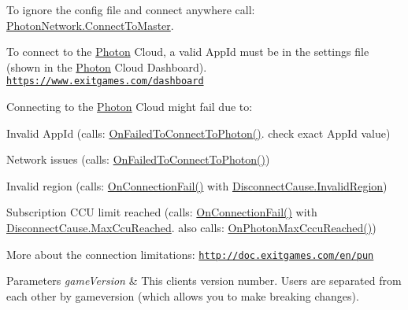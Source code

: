 To ignore the config file and connect anywhere call\+: \hyperlink{class_photon_network_a981e7244e915f41e18cb9da5f12fc858}{Photon\+Network.\+Connect\+To\+Master}.

To connect to the \hyperlink{namespace_photon}{Photon} Cloud, a valid App\+Id must be in the settings file (shown in the \hyperlink{namespace_photon}{Photon} Cloud Dashboard). \href{https://www.exitgames.com/dashboard}{\tt https\+://www.\+exitgames.\+com/dashboard}

Connecting to the \hyperlink{namespace_photon}{Photon} Cloud might fail due to\+:
\begin{DoxyItemize}
\item Invalid App\+Id (calls\+: \hyperlink{group__public_api_ggaf30bbea51cc8c4b1ddc239d1c5c1468fa7546497495fd3c2f785966943e8d0568}{On\+Failed\+To\+Connect\+To\+Photon()}. check exact App\+Id value)
\item Network issues (calls\+: \hyperlink{group__public_api_ggaf30bbea51cc8c4b1ddc239d1c5c1468fa7546497495fd3c2f785966943e8d0568}{On\+Failed\+To\+Connect\+To\+Photon()})
\item Invalid region (calls\+: \hyperlink{group__public_api_ggaf30bbea51cc8c4b1ddc239d1c5c1468fa90c9be8eb52ae376a236bfd0a28d7918}{On\+Connection\+Fail()} with \hyperlink{group__public_api_ggad61b1461cf60ad9e8d86923d111d5cc9aa8534012cb63e62c0b3a2335206117cc}{Disconnect\+Cause.\+Invalid\+Region})
\item Subscription C\+CU limit reached (calls\+: \hyperlink{group__public_api_ggaf30bbea51cc8c4b1ddc239d1c5c1468fa90c9be8eb52ae376a236bfd0a28d7918}{On\+Connection\+Fail()} with \hyperlink{group__public_api_ggad61b1461cf60ad9e8d86923d111d5cc9a522f961eb7a2b35f0ef4b99b4ad3bb0a}{Disconnect\+Cause.\+Max\+Ccu\+Reached}. also calls\+: \hyperlink{group__public_api_ggaf30bbea51cc8c4b1ddc239d1c5c1468fa1d2567b2c2f8ec1799a293b0359b4046}{On\+Photon\+Max\+Cccu\+Reached()})
\end{DoxyItemize}

More about the connection limitations\+: \href{http://doc.exitgames.com/en/pun}{\tt http\+://doc.\+exitgames.\+com/en/pun} 


\begin{DoxyParams}{Parameters}
{\em game\+Version} & This client\textquotesingle{}s version number. Users are separated from each other by gameversion (which allows you to make breaking changes).\\
\hline
\end{DoxyParams}

